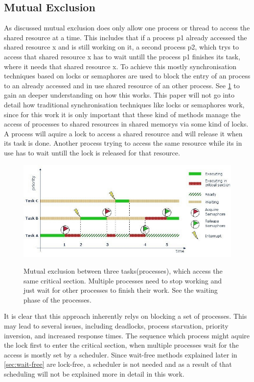 \subsection{Mutual Exclusion}\label{subsec:mutual-exclusion}

As discussed mutual exclusion does only allow one process or thread to access the shared resource at a time. This includes that if a process p1 already accessed the shared resource x and is still working on it, a second process p2, which trys to access that shared resource x has to wait untill the process p1 finishes its task, where it needs that shared resource x. To achieve this mostly synchronisation techniques based on locks or semaphores are used to block the entry of an process to an already accessed and in use shared resource of an other process. See \cref{fig:mutual-exclusion} to gain an deeper understanding on how this works. This paper will not go into detail how traditional synchronisation techniques like locks or semaphores work, since for this work it is only important that these kind of methods manage the access of processes to shared resources in shared memorys via some kind of locks. A process will aquire a lock to access a shared resource and will release it when its task is done. Another process trying to access the same resource while its in use has to wait untill the lock is released for that resource.

\begin{figure}[!ht]
   \centering
   \captionsetup{justification=centering}
   \caption{Mutual exclusion between three tasks(processes), which access the same critical section. Multiple processes need to stop working and just wait for other processes to finish their work. See the waiting phase of the processes. \cite{MutualExclusion}}
   \includegraphics[width=135mm]{images/mutual_exclusion.jpg}
   \label{fig:mutual-exclusion}
\end{figure}

It is clear that this approach inherently relys on blocking a set of processes. This may lead to several issues, including deadlocks, process starvation, priority inversion, and increased response times. The sequence which process might aquire the lock first to enter the critical section, when multiple processes wait for the access is mostly set by a scheduler. Since wait-free methods explained later in \cref{sec:wait-free} are lock-free, a scheduler is not needed and as a result of that scheduling will not be explained more in detail in this work. \cite{brandenburg2019multiprocessorrealtimelockingprotocols,MutexSemaphoreIPC}

